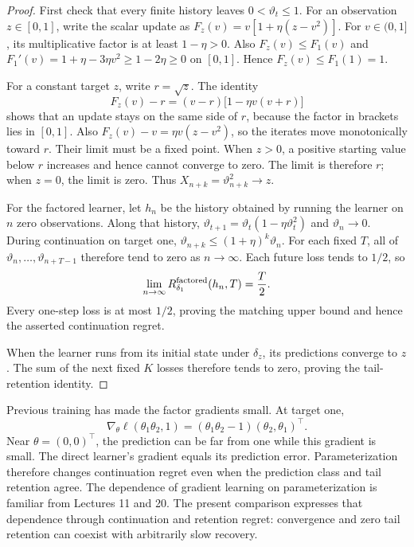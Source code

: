 \documentclass[11pt,twoside]{article}
\theoremstyle{definition}
\theoremstyle{remark}
\begin{document}
\begin{proof}
First check that every finite history leaves $0<\vartheta_t\le1$.
For an observation $z\in[0,1]$, write the scalar update as
$F_z(v)=v[1+\eta(z-v^2)]$. For $v\in(0,1]$, its multiplicative factor
is at least $1-\eta>0$. Also $F_z(v)\le F_1(v)$ and
$F_1'(v)=1+\eta-3\eta v^2\ge1-2\eta\ge0$ on $[0,1]$.
Hence $F_z(v)\le F_1(1)=1$.

For a constant target $z$, write $r=\sqrt z$. The identity
\begin{equation}
 F_z(v)-r=(v-r)\bigl[1-\eta v(v+r)\bigr]
 \label{eq:root-contraction}
\end{equation}
shows that an update stays on the same side of $r$, because the factor
in brackets lies in $[0,1]$. Also $F_z(v)-v=\eta v(z-v^2)$, so
the iterates move monotonically toward $r$. Their limit must be a fixed
point. When $z>0$, a positive starting value below $r$ increases and
hence cannot converge to zero. The limit is therefore $r$; when $z=0$,
the limit is zero. Thus $X_{n+k}=\vartheta_{n+k}^2\to z$.

For the factored learner, let $h_n$ be the history obtained by running
the learner on $n$ zero observations. Along that history,
$\vartheta_{t+1}=\vartheta_t(1-\eta\vartheta_t^2)$ and
$\vartheta_n\to0$. During continuation on target one,
$\vartheta_{n+k}\le(1+\eta)^k\vartheta_n$. For each fixed $T$,
all of $\vartheta_n,\ldots,\vartheta_{n+T-1}$ therefore tend to zero as
$n\to\infty$. Each future loss tends to $1/2$, so
\[
 \lim_{n\to\infty}R_{\delta_1}^{\rm factored}(h_n,T)=\frac T2.
\]
Every one-step loss is at most $1/2$, proving the matching upper bound
and hence the asserted continuation regret.

When the learner runs from its initial state under $\delta_z$, its
predictions converge to $z$. The sum of the next fixed $K$ losses therefore
tends to zero, proving the tail-retention identity.
\end{proof}

Previous training has made the factor gradients small. At target one,
\[
 \nabla_\theta\ell(\theta_1\theta_2,1)
 =(\theta_1\theta_2-1)(\theta_2,\theta_1)^\top.
\]
Near $\theta=(0,0)^\top$, the prediction can be far from one while this
gradient is small. The direct learner's gradient equals its prediction
error. Parameterization therefore changes continuation regret even when the
prediction class and tail retention agree. The dependence of gradient
learning on parameterization is familiar from Lectures 11 and 20. The
present comparison expresses that dependence through continuation and
retention regret: convergence and zero tail retention can coexist with
arbitrarily slow recovery.
\end{document}
